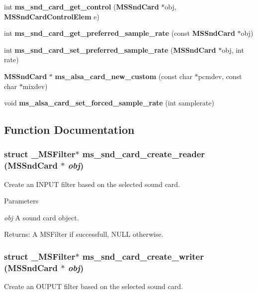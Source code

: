 \begin{DoxyCompactItemize}
\item 
int {\bf ms\_\-snd\_\-card\_\-get\_\-control} ({\bf MSSndCard} $\ast$obj, {\bf MSSndCardControlElem} e)
\item 
int {\bf ms\_\-snd\_\-card\_\-get\_\-preferred\_\-sample\_\-rate} (const {\bf MSSndCard} $\ast$obj)
\item 
int {\bf ms\_\-snd\_\-card\_\-set\_\-preferred\_\-sample\_\-rate} ({\bf MSSndCard} $\ast$obj, int rate)
\item 
{\bf MSSndCard} $\ast$ {\bf ms\_\-alsa\_\-card\_\-new\_\-custom} (const char $\ast$pcmdev, const char $\ast$mixdev)
\item 
void {\bf ms\_\-alsa\_\-card\_\-set\_\-forced\_\-sample\_\-rate} (int samplerate)
\end{DoxyCompactItemize}


\subsection{Function Documentation}
\subsubsection[{ms\_\-snd\_\-card\_\-create\_\-reader}]{\setlength{\rightskip}{0pt plus 5cm}struct \_\-MSFilter$\ast$ ms\_\-snd\_\-card\_\-create\_\-reader ({\bf MSSndCard} $\ast$ {\em obj})\hspace{0.3cm}{\ttfamily  [read]}}\label{group__mediastreamer2__soundcardfilter_ga32de8c5c905b869764f59d0d3f0c9fb5}
Create an INPUT filter based on the selected sound card.


\begin{DoxyParams}{Parameters}
\item[{\em obj}]A sound card object.\end{DoxyParams}
Returns: A MSFilter if successfull, NULL otherwise. 
\subsubsection[{ms\_\-snd\_\-card\_\-create\_\-writer}]{\setlength{\rightskip}{0pt plus 5cm}struct \_\-MSFilter$\ast$ ms\_\-snd\_\-card\_\-create\_\-writer ({\bf MSSndCard} $\ast$ {\em obj})\hspace{0.3cm}{\ttfamily  [read]}}\label{group__mediastreamer2__soundcardfilter_gada18baa91af814626e4ac647d5700435}
Create an OUPUT filter based on the selected sound card.


